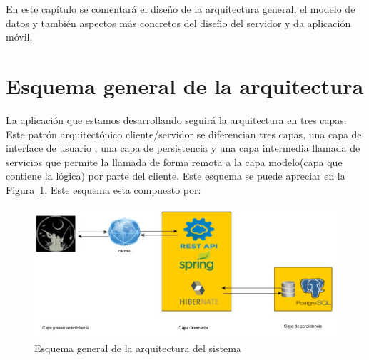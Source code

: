 

En este capítulo se comentará el diseño de la arquitectura general, el
modelo de datos y también aspectos más concretos del diseño del servidor y da aplicación
móvil.



\section{Esquema general de la arquitectura}
La aplicación que estamos desarrollando seguirá la arquitectura
en tres capas. Este patrón arquitectónico cliente/servidor se diferencian tres
capas, una capa de interface de usuario , una capa de persistencia
y una capa intermedia llamada de servicios que permite la llamada de forma remota a la capa modelo(capa que contiene la lógica) por parte del cliente. Este esquema se puede apreciar en la Figura~\ref{fig:arquitectura2}. Este esquema esta compuesto por:




\begin{figure}
		\centering
		\includegraphics[width=\textwidth] {arquitectura2.png}
		\caption{Esquema general de la arquitectura del sistema }\label{fig:arquitectura2}
	\end{figure}



